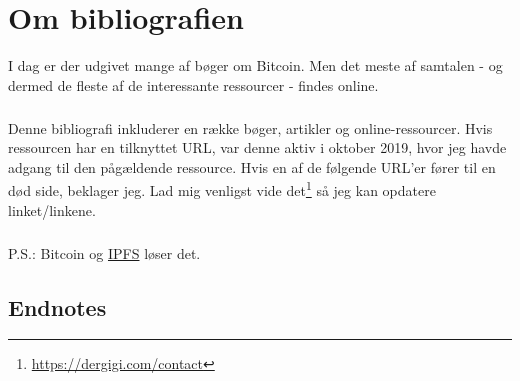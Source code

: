\documentclass[paper=6in:9in,pagesize=pdftex,headinclude=on,footinclude=on,12pt]{scrbook}
\begin{document}
\listoffigures

\chapter*{Om bibliografien}

I dag er der udgivet mange af bøger om Bitcoin. Men det meste af samtalen - og dermed de fleste af de interessante ressourcer - findes online.\paragraph{} Denne bibliografi inkluderer en række bøger, artikler og online-ressourcer. Hvis ressourcen har en tilknyttet URL, var denne aktiv i oktober 2019, hvor jeg havde adgang til den pågældende ressource. Hvis en af de følgende URL'er fører til en død side, beklager jeg. Lad mig venligst vide det\footnote{\url{https://dergigi.com/contact}} så jeg kan opdatere linket/linkene.\paragraph{} P.S.: Bitcoin og \href{https://ipfs.io/}{IPFS} løser det. 

\section*{Endnotes}

\end{document}
